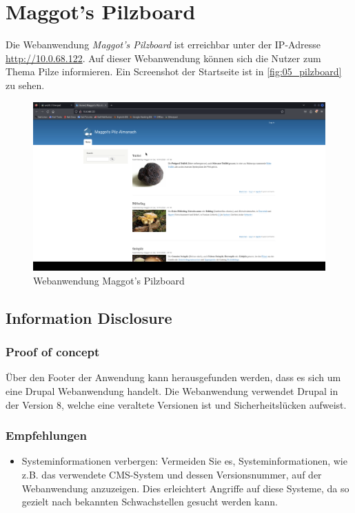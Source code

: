 \pagebreak
\chapter{Maggot's Pilzboard}
Die Webanwendung \textit{Maggot's Pilzboard} ist erreichbar unter der IP-Adresse \url{http://10.0.68.122}. Auf dieser Webanwendung können sich die Nutzer zum Thema Pilze informieren. Ein Screenshot der Startseite ist in \autoref{fig:05_pilzboard} zu sehen.


\vfill
\begin{figure}[!ht]
    \centering
    \includegraphics[width=\linewidth]{images/screenshots/07_pilzboard.png}
    \caption{Webanwendung Maggot's Pilzboard}
    \label{fig:05_pilzboard}
\end{figure}
\vfill
\newpage


\section{\makecvssbadge Information Disclosure}

\subsection*{Proof of concept}
Über den Footer der Anwendung kann herausgefunden werden, dass es sich um eine Drupal Webanwendung handelt. Die Webanwendung verwendet Drupal in der Version 8, welche eine veraltete Versionen ist und Sicherheitslücken aufweist.

\subsection*{Empfehlungen}
\begin{itemize}
    \item Systeminformationen verbergen: Vermeiden Sie es, Systeminformationen, wie z.B. das verwendete CMS-System und dessen Versionsnummer, auf der Webanwendung anzuzeigen. Dies erleichtert Angriffe auf diese Systeme, da so gezielt nach bekannten Schwachstellen gesucht werden kann.
\end{itemize}

